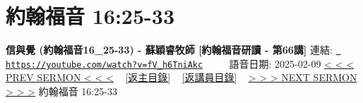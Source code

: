 \documentclass{book}
\begin{document}
\section{約翰福音 16:25-33}
\label{sec:fV_h6TniAkc}
\textbf{信與覺 (約翰福音16\_25-33) - 蘇穎睿牧師 [約翰福音研讀 - 第66講]}
\newline
\newline
連結: \href{https://youtube.com/watch?v=fV_h6TniAkc}{\texttt{ https://youtube.com/watch?v=fV\_h6TniAkc}} ~~~~ 語音日期: 2025-02-09 
\newline
\newline
\hyperref[sec:HaGDtN4u47U]{< < < PREV SERMON < < <}
~
\hyperlink{toc}{[返主目錄]}
~
\hyperref[ch:preacher5]{[返講員目錄]}
~
\hyperref[sec:wiDRWRXrtjM]{> > > NEXT SERMON > > >}
\newline
\newline
約翰福音 16:25-33
\newline
\end{document}
